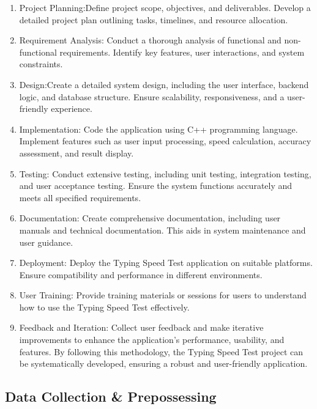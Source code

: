 \begin{enumerate}
    \item  Project Planning:Define project scope, objectives, and deliverables. Develop a detailed project plan outlining tasks, timelines, and resource allocation.

\item  Requirement Analysis: Conduct a thorough analysis of functional and non-functional requirements. Identify key features, user interactions, and system constraints.

\item  Design:Create a detailed system design, including the user interface, backend logic, and database structure. Ensure scalability, responsiveness, and a user-friendly experience.

\item  Implementation: Code the application using C++ programming language. Implement features such as user input processing, speed calculation, accuracy assessment, and result display.

\item  Testing: Conduct extensive testing, including unit testing, integration testing, and user acceptance testing. Ensure the system functions accurately and meets all specified requirements.

\item Documentation: Create comprehensive documentation, including user manuals and technical documentation. This aids in system maintenance and user guidance.

\item  Deployment: Deploy the Typing Speed Test application on suitable platforms. Ensure compatibility and performance in different environments.

\item User Training: Provide training materials or sessions for users to understand how to use the Typing Speed Test effectively.

\item Feedback and Iteration: Collect user feedback and make iterative improvements to enhance the application's performance, usability, and features.
\vspace{6px}
By following this methodology, the Typing Speed Test project can be systematically developed, ensuring a robust and user-friendly application.
\end{enumerate}

\subsection{Data Collection \& Prepossessing }

